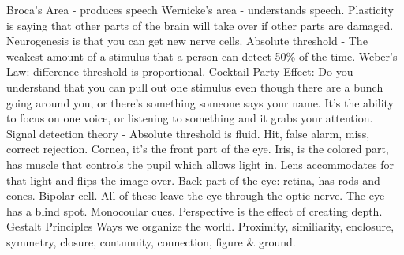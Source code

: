 \markdownRendererUlItem Broca's Area - produces speech\markdownRendererUlItemEnd 
\markdownRendererUlItem Wernicke's area - understands speech.\markdownRendererUlItemEnd 
\markdownRendererUlItem Plasticity is saying that other parts of the brain will take over if other parts are damaged.\markdownRendererUlItemEnd 
\markdownRendererUlItem Neurogenesis is that you can get new nerve cells.\markdownRendererUlItemEnd 
\markdownRendererUlItem Absolute threshold - The weakest amount of a stimulus that a person can detect 50\% of the time.\markdownRendererUlItemEnd 
\markdownRendererUlItem Weber's Law: difference threshold is proportional.\markdownRendererUlItemEnd 
\markdownRendererUlItem Cocktail Party Effect: Do you understand that you can pull out one stimulus even though there are a bunch going around you, or there's something someone says your name. It's the ability to focus on one voice, or listening to something and it grabs your attention.\markdownRendererUlItemEnd 
\markdownRendererUlItem Signal detection theory - Absolute threshold is fluid. Hit, false alarm, miss, correct rejection.\markdownRendererUlItemEnd 
\markdownRendererUlEnd \markdownRendererInterblockSeparator
{}\markdownRendererInterblockSeparator
{}\markdownRendererUlBeginTight
\markdownRendererUlItem Cornea, it's the front part of the eye.\markdownRendererUlItemEnd 
\markdownRendererUlItem Iris, is the colored part, has muscle that controls the pupil which allows light in.\markdownRendererUlItemEnd 
\markdownRendererUlItem Lens accommodates for that light and flips the image over.\markdownRendererUlItemEnd 
\markdownRendererUlItem Back part of the eye: retina, has rods and cones.\markdownRendererUlItemEnd 
\markdownRendererUlItem Bipolar cell.\markdownRendererUlItemEnd 
\markdownRendererUlItem All of these leave the eye through the optic nerve. The eye has a blind spot.\markdownRendererUlItemEnd 
\markdownRendererUlItem Monocoular cues.\markdownRendererInterblockSeparator
{}\markdownRendererUlBeginTight
\markdownRendererUlItem Perspective is the effect of creating depth.\markdownRendererUlItemEnd 
\markdownRendererUlEndTight \markdownRendererUlItemEnd 
\markdownRendererUlItem Gestalt Principles\markdownRendererInterblockSeparator
{}\markdownRendererUlBeginTight
\markdownRendererUlItem Ways we organize the world.\markdownRendererUlItemEnd 
\markdownRendererUlItem Proximity, similiarity, enclosure, symmetry, closure, contunuity, connection, figure & ground.\markdownRendererUlItemEnd 
\markdownRendererUlEndTight \markdownRendererUlItemEnd 
